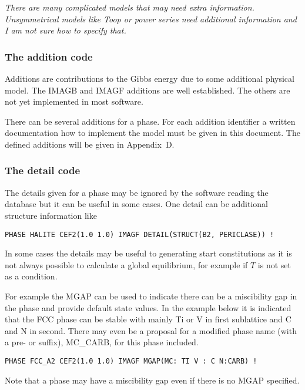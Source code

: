 \documentclass[12pt]{article}
\begin{document}
{\em There are many complicated models that may need extra
  information.  Unsymmetrical models like Toop or power series need
  additional information and I am not sure how to specify that.}


\subsubsection{The addition code}

Additions are contributions to the Gibbs energy due to some additional
physical model.  The IMAGB and IMAGF additions are well established.
The others are not yet implemented in most software.

There can be several additions for a phase.  For each addition
identifier a written documentation how to implement the model must be
given in this document.  The defined additions will be given in
Appendix~D.

\subsubsection{The detail code}\label{sec:detail}

The details given for a phase may be ignored by the software
reading the database but it can be useful in some cases.  One
detail can be additional structure information like

\begin{verbatim}
PHASE HALITE CEF2(1.0 1.0) IMAGF DETAIL(STRUCT(B2, PERICLASE)) !
\end{verbatim}

In some cases the details may be useful to generating start
constitutions as it is not always possible to calculate a global
equilibrium, for example if $T$ is not set as a condition.

For example the MGAP can be used to indicate there can be a
miscibility gap in the phase and provide default state values.  In the
example below it is indicated that the FCC phase can be stable with
mainly Ti or V in first sublattice and C and N in second.  There may
even be a proposal for a modified phase name (with a pre- or suffix),
MC\_CARB, for this phase included.

\begin{verbatim}
PHASE FCC_A2 CEF2(1.0 1.0) IMAGF MGAP(MC: TI V : C N:CARB) !
\end{verbatim}

Note that a phase may have a miscibility gap even if there is no MGAP
specified.
\end{document}
